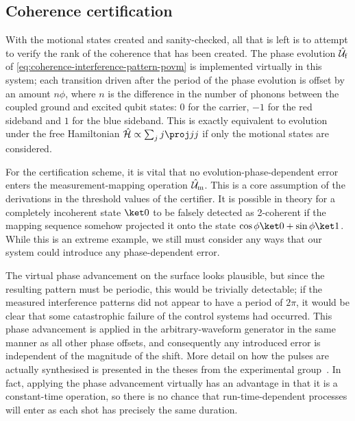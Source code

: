 \subsection{Coherence certification}

With the motional states created and sanity-checked, all that is left is to attempt to verify the rank of the coherence that has been created.
The phase evolution $\hat{\mathcal U}_{\text f}$ of \cref{eq:coherence-interference-pattern-povm} is implemented virtually in this system; each transition driven after the period of the phase evolution is offset by an amount $n\phi$, where $n$ is the difference in the number of phonons between the coupled ground and excited qubit states: $0$ for the carrier, $-1$ for the red sideband and $1$ for the blue sideband.
This is exactly equivalent to evolution under the free Hamiltonian $\H \propto \sum_j j\proj jj$ if only the motional states are considered.

For the certification scheme, it is vital that no evolution-phase-dependent error enters the measurement-mapping operation $\hat{\mathcal U}_{\text m}$.
This is a core assumption of the derivations in the threshold values of the certifier.
It is possible in theory for a completely incoherent state $\ket0$ to be falsely detected as 2-coherent if the mapping sequence somehow projected it onto the state $\cos\phi\ket0+\sin\phi\ket1$.
While this is an extreme example, we still must consider any ways that our system could introduce any phase-dependent error.

The virtual phase advancement on the surface looks plausible, but since the resulting pattern must be periodic, this would be trivially detectable; if the measured interference patterns did not appear to have a period of $2\pi$, it would be clear that some catastrophic failure of the control systems had occurred.
This phase advancement is applied in the arbitrary-waveform generator in the same manner as all other phase offsets, and consequently any introduced error is independent of the magnitude of the shift.
More detail on how the pulses are actually synthesised is presented in the theses from the experimental group~\cite{Corfield2022}.
In fact, applying the phase advancement virtually has an advantage in that it is a constant-time operation, so there is no chance that run-time-dependent processes will enter as each shot has precisely the same duration.

